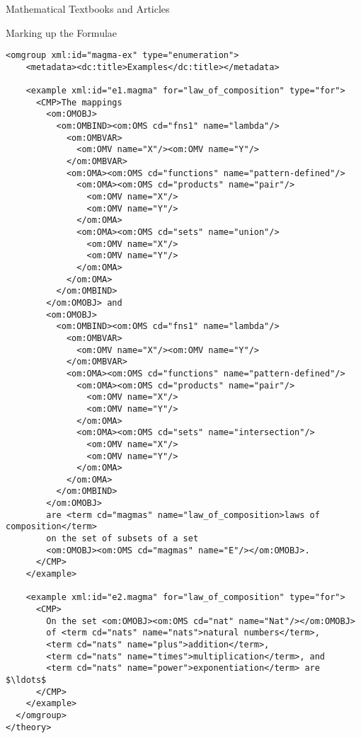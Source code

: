 \begin{tchapter}[id=algebra,short=Textbooks and Articles]{Mathematical Textbooks and Articles}
\begin{tsection}[id=formulae]{Marking up the Formulae}
\begin{lstlisting}[label=lst:example-formulae,mathescape,
    caption={Examples for magmas with {\openmath} objects},
    index={example,CMP,OMOBJ,OMBIND,OMS,OMA,OMV}]
  <omgroup xml:id="magma-ex" type="enumeration">
    <metadata><dc:title>Examples</dc:title></metadata>

    <example xml:id="e1.magma" for="law_of_composition" type="for">
      <CMP>The mappings 
        <om:OMOBJ>
          <om:OMBIND><om:OMS cd="fns1" name="lambda"/>
            <om:OMBVAR>
              <om:OMV name="X"/><om:OMV name="Y"/>
            </om:OMBVAR>
            <om:OMA><om:OMS cd="functions" name="pattern-defined"/>
              <om:OMA><om:OMS cd="products" name="pair"/>
                <om:OMV name="X"/>
                <om:OMV name="Y"/>
              </om:OMA>
              <om:OMA><om:OMS cd="sets" name="union"/>
                <om:OMV name="X"/>
                <om:OMV name="Y"/>
              </om:OMA>
            </om:OMA>
          </om:OMBIND>
        </om:OMOBJ> and 
        <om:OMOBJ>
          <om:OMBIND><om:OMS cd="fns1" name="lambda"/>
            <om:OMBVAR>
              <om:OMV name="X"/><om:OMV name="Y"/>
            </om:OMBVAR>  
            <om:OMA><om:OMS cd="functions" name="pattern-defined"/>
              <om:OMA><om:OMS cd="products" name="pair"/>
                <om:OMV name="X"/>
                <om:OMV name="Y"/>
              </om:OMA>
              <om:OMA><om:OMS cd="sets" name="intersection"/>
                <om:OMV name="X"/>
                <om:OMV name="Y"/>
              </om:OMA>
            </om:OMA>
          </om:OMBIND>
        </om:OMOBJ>
        are <term cd="magmas" name="law_of_composition>laws of composition</term>
        on the set of subsets of a set 
        <om:OMOBJ><om:OMS cd="magmas" name="E"/></om:OMOBJ>.
      </CMP>
    </example>
    
    <example xml:id="e2.magma" for="law_of_composition" type="for">
      <CMP>
        On the set <om:OMOBJ><om:OMS cd="nat" name="Nat"/></om:OMOBJ> 
        of <term cd="nats" name="nats">natural numbers</term>, 
        <term cd="nats" name="plus">addition</term>, 
        <term cd="nats" name="times">multiplication</term>, and 
        <term cd="nats" name="power">exponentiation</term> are $\ldots$
      </CMP>
    </example>
  </omgroup>
</theory>
\end{lstlisting}


\end{tsection}
\end{tchapter}
